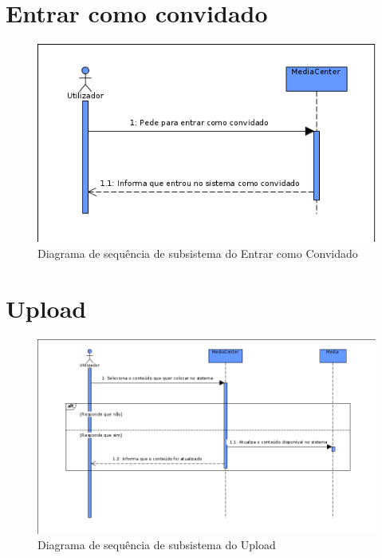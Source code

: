 \documentclass[a4paper]{report}
\begin{document}
\section{Entrar como convidado}
\begin{figure}[H]
	\centering 
    \includegraphics[width=\textwidth]{images/convidadoSub.png}  
    \caption{Diagrama de sequência de subsistema do Entrar como Convidado}
\end{figure}

\section{Upload}
\begin{figure}[H]
	\centering 
    \includegraphics[width=\textwidth]{images/uploadSub.png}  
    \caption{Diagrama de sequência de subsistema do Upload}
\end{figure}
\end{document}
